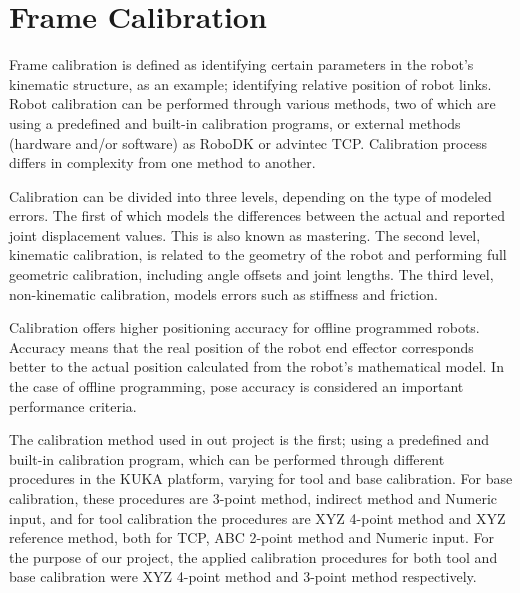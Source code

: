 	\newpage		
	\section{Frame Calibration}
	Frame calibration is defined as identifying certain parameters in the robot’s kinematic structure, as an example; identifying relative position of robot links. Robot calibration can be performed through various methods, two of which are using a predefined and built-in calibration programs, or external methods (hardware and/or software) as RoboDK or advintec TCP. Calibration process differs in complexity from one method to another. 

	Calibration can be divided into three levels, depending on the type of modeled errors. The first of which models the differences between the actual and reported joint displacement values. This is also known as mastering. The second level, kinematic calibration, is related to the geometry of the robot and performing full geometric calibration, including angle offsets and joint lengths. The third level, non-kinematic calibration, models errors such as stiffness and friction.

	Calibration offers higher positioning accuracy for offline programmed robots. Accuracy means that the real position of the robot end effector corresponds better to the actual position calculated from the robot’s mathematical model. In the case of offline programming, pose accuracy is considered an important performance criteria.
		
	The calibration method used in out project is the first; using a predefined and built-in calibration program, which can be performed through different procedures in the KUKA platform, varying for tool and base calibration. For base calibration, these procedures are 3-point method, indirect method and Numeric input, and for tool calibration the procedures are XYZ 4-point method and XYZ reference method, both for TCP, ABC 2-point method and Numeric input. For the purpose of our project, the applied calibration procedures for both tool and base calibration were XYZ 4-point method and 3-point method respectively.


